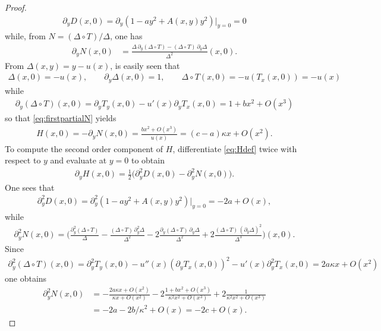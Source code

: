 \documentclass{article}
\theoremstyle{plain}
\theoremstyle{definition}
\theoremstyle{remark}
\begin{document}
\begin{proof}
\begin{align}
        \partial_yD(x,0) = \partial_y(1-ay^2 + A(x,y)y^2)|_{y=0} = 0
    \end{align}
    while, from $N = (\Delta\circ T)/\Delta$, one has
    \begin{align}
        \partial_yN(x,0) &= \frac{\Delta\,\partial_y(\Delta\circ T)-(\Delta\circ T)\,\partial_y\Delta}{\Delta^2}(x,0).\label{eq:firstpartialN}
    \end{align}
    From $\Delta(x,y) = y-u(x)$, is easily seen that
    \begin{align}
        \Delta(x,0) = -u(x),\qquad \partial_y\Delta(x,0) = 1,\qquad \Delta\circ T(x,0) = -u(T_x(x,0)) = -u(x)
    \end{align}
    while
    \begin{align}
        \partial_y(\Delta\circ T)(x,0) = \partial_y T_y(x,0)-u'(x)\partial_yT_x(x,0) = 1+bx^2 + O(x^3)
    \end{align}
    so that \eqref{eq:firstpartialN} yields
    \begin{align}
        H(x,0) = -\partial_yN(x,0) = \frac{bx^2 + O(x^3)}{u(x)} = (c-a)\kappa x + O(x^2).\label{eq:Hfirst}
    \end{align}
    To compute the second order component of $H$, differentiate \eqref{eq:Hdef} twice with respect to $y$ and evaluate at $y=0$ to obtain
    \begin{align}
        \partial_yH(x,0) = \frac{1}{2}\big(\partial^2_yD(x,0)-\partial_y^2N(x,0)\big).\label{eq:partialH}
    \end{align}
    One sees that
    \begin{align}
        \partial^2_yD(x,0) = \partial^2_y(1-ay^2 + A(x,y)y^2)|_{y=0} = -2a+O(x),
    \end{align}
    while
    \begin{align}
        \partial^2_yN(x,0) = \bigg(\frac{\partial^2_y(\Delta\circ T)}{\Delta} - \frac{(\Delta\circ T)\,\partial^2_y\Delta}{\Delta^2} - 2\frac{\partial_y(\Delta\circ T)\,\partial_y\Delta}{\Delta^2} + 2\frac{(\Delta\circ T)\,(\partial_y\Delta)^2}{\Delta^3}\bigg)(x,0).
    \end{align}
    Since
    \begin{align}
        \partial^2_y(\Delta\circ T)(x,0) = \partial^2_yT_y(x,0) - u''(x)(\partial_yT_x(x,0))^2 - u'(x)\partial^2_yT_x(x,0) = 2a\kappa x+O(x^2)
    \end{align}
    one obtains
    \begin{align}
        \partial^2_yN(x,0) &= -\frac{2a\kappa x+O(x^2)}{\kappa x+O(x^2)}-2\frac{1+bx^2+O(x^3)}{\kappa^2x^2+O(x^3)} + 2\frac{1}{\kappa^2x^2 + O(x^3)}\\&=-2a-2b/\kappa^2 + O(x) = -2c+O(x).

\end{align}
\end{proof}
\end{document}
